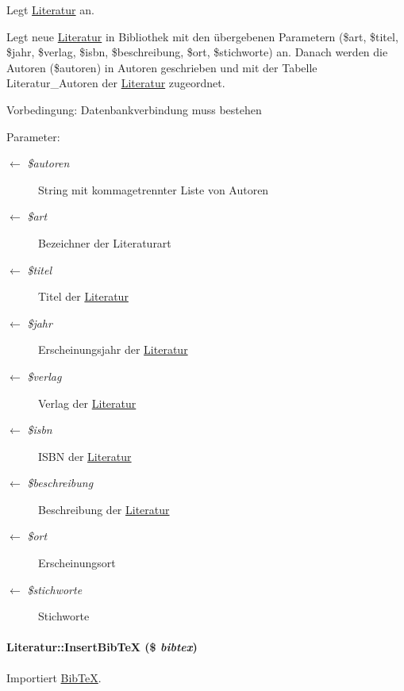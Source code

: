 Legt \hyperlink{classLiteratur}{Literatur} an. 

Legt neue \hyperlink{classLiteratur}{Literatur} in Bibliothek mit den übergebenen Parametern (\$art, \$titel, \$jahr, \$verlag, \$isbn, \$beschreibung, \$ort, \$stichworte) an. Danach werden die Autoren (\$autoren) in Autoren geschrieben und mit der Tabelle Literatur\_\-Autoren der \hyperlink{classLiteratur}{Literatur} zugeordnet. \begin{Desc}
\item[Vorbedingung:]Datenbankverbindung muss bestehen \end{Desc}
\begin{Desc}
\item[Parameter:]
\begin{description}
\item[\mbox{$\leftarrow$} {\em \$autoren}]String mit kommagetrennter Liste von Autoren \item[\mbox{$\leftarrow$} {\em \$art}]Bezeichner der Literaturart \item[\mbox{$\leftarrow$} {\em \$titel}]Titel der \hyperlink{classLiteratur}{Literatur} \item[\mbox{$\leftarrow$} {\em \$jahr}]Erscheinungsjahr der \hyperlink{classLiteratur}{Literatur} \item[\mbox{$\leftarrow$} {\em \$verlag}]Verlag der \hyperlink{classLiteratur}{Literatur} \item[\mbox{$\leftarrow$} {\em \$isbn}]ISBN der \hyperlink{classLiteratur}{Literatur} \item[\mbox{$\leftarrow$} {\em \$beschreibung}]Beschreibung der \hyperlink{classLiteratur}{Literatur} \item[\mbox{$\leftarrow$} {\em \$ort}]Erscheinungsort \item[\mbox{$\leftarrow$} {\em \$stichworte}]Stichworte \end{description}
\end{Desc}
\hypertarget{classLiteratur_d466a307b1971ee736e1d4ba9342dc55}{
\paragraph[InsertBibTeX]{\setlength{\rightskip}{0pt plus 5cm}Literatur::Insert\-Bib\-Te\-X (\$ {\em bibtex})}\hfill}
\label{classLiteratur_d466a307b1971ee736e1d4ba9342dc55}


Importiert \hyperlink{classBibTeX}{Bib\-Te\-X}. 

